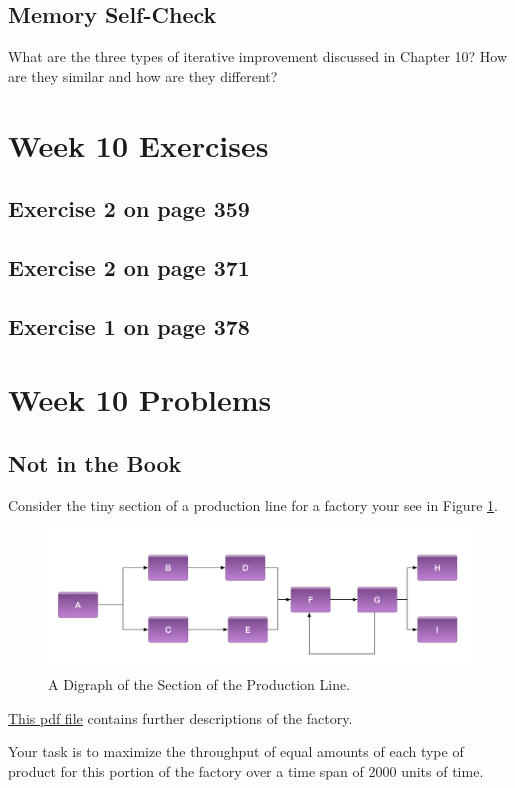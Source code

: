 \documentclass[12pt]{amsart}
\begin{document}
\subsection{Memory Self-Check}
What are the three types of iterative improvement discussed in Chapter 10? How are they similar and how are they different?
 \section{Week 10 Exercises}
\subsection{ Exercise 2 on page 359}
\subsection{Exercise 2 on page 371} 
\subsection{Exercise 1 on page 378} 


\section{Week 10 Problems}
\subsection{Not in the Book}
Consider the tiny section of a production line for a factory your see in Figure \ref{fig:factory1}. 
\begin{figure}[htb]
  \includegraphics[width=\linewidth]{../support_files/tiny_factory.png}
  \caption{A Digraph of the Section of the Production Line.}
  \label{fig:factory1}
\end{figure}

\href{run:../support_files/tiny_factory_step_descriptions.pdff}{This pdf file} contains further descriptions of the factory.

Your task is to maximize the throughput of equal amounts of each type of product for this portion of the factory over a time span of 2000 units of time.
\end{document}
